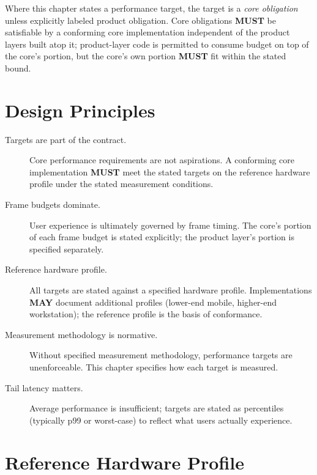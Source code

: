 \documentclass[11pt,letterpaper]{report}
\newcounter{requirement}[chapter]
\newcommand{\MUST}{\textbf{MUST}}
\newcommand{\MAY}{\textbf{MAY}}
\begin{document}
\begin{requirement}
  \label{req:perf:core-product-budget-boundary}
  Where this chapter states a performance target, the target is a
  \emph{core obligation} unless explicitly labeled product
  obligation. Core obligations \MUST{} be satisfiable by a
  conforming core implementation independent of the product
  layers built atop it; product-layer code is permitted to
  consume budget on top of the core's portion, but the core's
  own portion \MUST{} fit within the stated bound.
\end{requirement}

\section{Design Principles}
\label{sec:perf:principles}

\begin{description}
  \item[Targets are part of the contract.] Core performance
    requirements are not aspirations. A conforming core
    implementation \MUST{} meet the stated targets on the
    reference hardware profile under the stated measurement
    conditions.
  \item[Frame budgets dominate.] User experience is ultimately
    governed by frame timing. The core's portion of each frame
    budget is stated explicitly; the product layer's portion is
    specified separately.
  \item[Reference hardware profile.] All targets are stated
    against a specified hardware profile. Implementations \MAY{}
    document additional profiles (lower-end mobile, higher-end
    workstation); the reference profile is the basis of
    conformance.
  \item[Measurement methodology is normative.] Without specified
    measurement methodology, performance targets are
    unenforceable. This chapter specifies how each target is
    measured.
  \item[Tail latency matters.] Average performance is
    insufficient; targets are stated as percentiles (typically
    p99 or worst-case) to reflect what users actually experience.
\end{description}

\section{Reference Hardware Profile}
\label{sec:perf:hardware}
\end{document}
